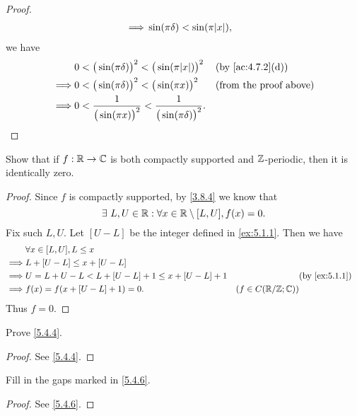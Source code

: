 \begin{proof}
\begin{align*}
    \implies & \sin(\pi \delta) < \sin(\pi \abs{x}),
  \end{align*}
  we have
  \begin{align*}
             & 0 < \big(\sin(\pi \delta)\big)^2 < \big(\sin(\pi \abs{x})\big)^2                  &  & \text{(by \cref{ac:4.7.2}(d))} \\
    \implies & 0 < \big(\sin(\pi \delta)\big)^2 < \big(\sin(\pi x)\big)^2                        &  & \text{(from the proof above)}  \\
    \implies & 0 < \dfrac{1}{\big(\sin(\pi x)\big)^2} < \dfrac{1}{\big(\sin(\pi \delta)\big)^2}.
  \end{align*}
\end{proof}

\exercisesection

\begin{ex}\label{ex:5.4.1}
  Show that if \(f : \mathbb{R} \to \mathbb{C}\) is both compactly supported and \(\mathbb{Z}\)-periodic, then it is identically zero.
\end{ex}

\begin{proof}
  Since \(f\) is compactly supported, by \cref{3.8.4} we know that
  \[
    \exists\ L, U \in \mathbb{R} : \forall x \in \mathbb{R} \setminus [L, U], f(x) = 0.
  \]
  Fix such \(L, U\).
  Let \([U - L]\) be the integer defined in \cref{ex:5.1.1}.
  Then we have
  \begin{align*}
             & \forall x \in [L, U], L \leq x                                                                               \\
    \implies & L + [U - L] \leq x + [U - L]                                                                                 \\
    \implies & U = L + U - L < L + [U - L] + 1 \leq x + [U - L] + 1 &                         & \text{(by \cref{ex:5.1.1})} \\
    \implies & f(x) = f(x + [U - L] + 1) = 0.                       & (f \in C(\R / \Z ; \C))
  \end{align*}
  Thus \(f = 0\).
\end{proof}

\begin{ex}\label{ex:5.4.2}
  Prove \cref{5.4.4}.
\end{ex}

\begin{proof}
  See \cref{5.4.4}.
\end{proof}

\begin{ex}\label{ex:5.4.3}
  Fill in the gaps marked in \cref{5.4.6}.
\end{ex}

\begin{proof}
  See \cref{5.4.6}.
\end{proof}